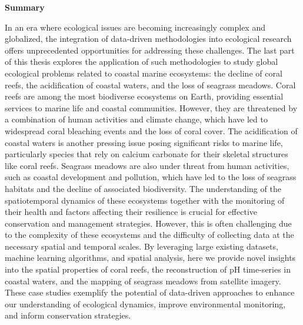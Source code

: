 \thispagestyle{empty}

\begin{center}
    \textbf{\Large Summary}
\end{center}

In an era where ecological issues are becoming increasingly complex and
globalized, the integration of data-driven methodologies into ecological
research offers unprecedented opportunities for addressing these challenges.
The last part of this thesis explores the application of such methodologies to
study global ecological problems related to coastal marine ecosystems: the
decline of coral reefs, the acidification of coastal waters, and the loss of
seagrass meadows. Coral reefs are among the most biodiverse ecosystems on
Earth, providing essential services to marine life and coastal communities.
However, they are threatened by a combination of human activities and climate
change, which have led to widespread coral bleaching events and the loss of
coral cover. The acidification of coastal waters is another pressing issue
posing significant risks to marine life, particularly species that rely on
calcium carbonate for their skeletal structures like coral reefs. Seagrass
meadows are also under threat from human activities, such as coastal
development and pollution, which have led to the loss of seagrass habitats and
the decline of associated biodiversity. The understanding of the spatiotemporal
dynamics of these ecosystems together with the monitoring of their health and
factors affecting their resilience is crucial for effective conservation and
management strategies. However, this is often challenging due to the complexity
of these ecosystems and the difficulty of collecting data at the necessary
spatial and temporal scales. By leveraging large existing datasets, machine
learning algorithms, and spatial analysis, here we provide novel insights
into the spatial properties of coral reefs, the reconstruction of pH
time-series in coastal waters, and the mapping of seagrass meadows from
satellite imagery. These case studies exemplify the potential of data-driven
approaches to enhance our understanding of ecological dynamics, improve
environmental monitoring, and inform conservation strategies.